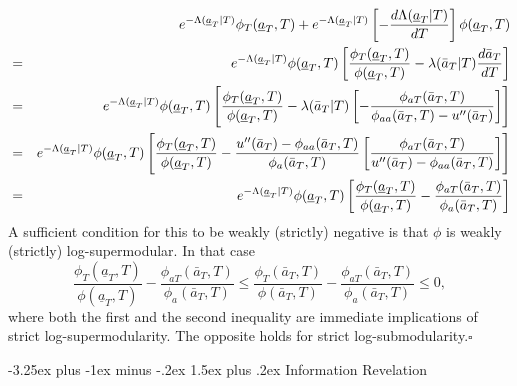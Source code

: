 \documentclass[12pt]{article}
\makeatletter
\renewcommand{\subsection}{%
  \@startsection{subsection}{2}{\z@}%
  {-3.25ex plus -1ex minus -.2ex}%
  {1.5ex plus .2ex}%
  {\normalfont\large\bfseries}%
}
\makeatother
\begin{document}
\begin{eqnarray*}
&&e^{-\Lambda (\underline{a}_{T}|T)}\phi _{T}(\underline{a}%
_{T},T)+e^{-\Lambda (\underline{a}_{T}|T)}\left[ -\frac{d\Lambda (\underline{%
a}_{T}|T)}{dT}\right] \phi (\underline{a}_{T},T) \\
&=&e^{-\Lambda (\underline{a}_{T}|T)}\phi (\underline{a}_{T},T)\left[ \frac{%
\phi _{T}(\underline{a}_{T},T)}{\phi (\underline{a}_{T},T)}-\lambda (\bar{a}%
_{T}|T)\frac{d\bar{a}_{T}}{dT}\right] \\
&=&e^{-\Lambda (\underline{a}_{T}|T)}\phi (\underline{a}_{T},T)\left[ \frac{%
\phi _{T}(\underline{a}_{T},T)}{\phi (\underline{a}_{T},T)}-\lambda (\bar{a}%
_{T}|T)\left[ -\frac{\phi _{aT}(\bar{a}_{T},T)}{\phi _{aa}(\bar{a}%
_{T},T)-u^{\prime \prime }(\bar{a}_{T})}\right] \right] \\
&=&e^{-\Lambda (\underline{a}_{T}|T)}\phi (\underline{a}_{T},T)\left[ \frac{%
\phi _{T}(\underline{a}_{T},T)}{\phi (\underline{a}_{T},T)}-\frac{u^{\prime
\prime }(\bar{a}_{T})-\phi _{aa}(\bar{a}_{T},T)}{\phi _{a}(\bar{a}_{T},T)}%
\left[ \frac{\phi _{aT}(\bar{a}_{T},T)}{ u^{\prime \prime }(\bar{a}_{T}) - \phi _{aa}(\bar{a}%
_{T},T)}\right] \right] \\
&=&e^{-\Lambda (\underline{a}_{T}|T)}\phi (\underline{a}_{T},T)\left[ \frac{%
\phi _{T}(\underline{a}_{T},T)}{\phi (\underline{a}_{T},T)}-\frac{\phi _{aT}(%
\bar{a}_{T},T)}{\phi _{a}(\bar{a}_{T},T)}\right]
\end{eqnarray*}%
A sufficient condition for this to be weakly (strictly) negative is that $\phi $ is
weakly (strictly) log-supermodular. In that case 
\begin{equation*}
\frac{\phi _{T}(\underline{a}_{T},T)}{\phi (\underline{a}_{T},T)}-\frac{\phi
_{aT}(\bar{a}_{T},T)}{\phi _{a}(\bar{a}_{T},T)} \leq \frac{\phi _{T}(\bar{a}%
_{T},T)}{\phi (\bar{a}_{T},T)}-\frac{\phi _{aT}(\bar{a}_{T},T)}{\phi _{a}(%
\bar{a}_{T},T)} \leq 0,
\end{equation*}%
where both the first and the second inequality are immediate implications of
strict log-supermodularity. The opposite holds for strict log-submodularity.$%
\square $

\bigskip








\subsection{Information Revelation}
\label{online_app:revelation}
\end{document}
